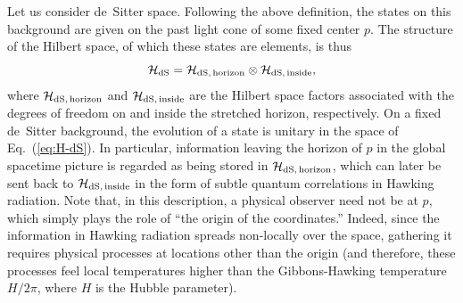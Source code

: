 \documentclass[12pt]{article}
\begin{document}
Let us consider de~Sitter space.  Following the above definition, the 
states on this background are given on the past light cone of some fixed 
center $p$.  The structure of the Hilbert space, of which these states 
are elements, is thus
%
\begin{equation}
  {\cal H}_{\rm dS} = {\cal H}_{\rm dS,\, horizon} 
    \otimes {\cal H}_{\rm dS,\, inside},
\label{eq:H-dS}
\end{equation}
%
where ${\cal H}_{\rm dS,\, horizon}$ and ${\cal H}_{\rm dS,\, inside}$ 
are the Hilbert space factors associated with the degrees of freedom on 
and inside the stretched horizon, respectively.  On a fixed de~Sitter 
background, the evolution of a state is unitary in the space of 
Eq.~(\ref{eq:H-dS}).  In particular, information leaving the horizon 
of $p$ in the global spacetime picture is regarded as being stored 
in ${\cal H}_{\rm dS,\, horizon}$, which can later be sent back to 
${\cal H}_{\rm dS,\, inside}$ in the form of subtle quantum correlations 
in Hawking radiation.  Note that, in this description, a physical observer 
need not be at $p$, which simply plays the role of ``the origin of the 
coordinates.''  Indeed, since the information in Hawking radiation spreads 
non-locally over the space, gathering it requires physical processes 
at locations other than the origin (and therefore, these processes feel 
local temperatures higher than the Gibbons-Hawking temperature $H/2\pi$, 
where $H$ is the Hubble parameter).
\end{document}
